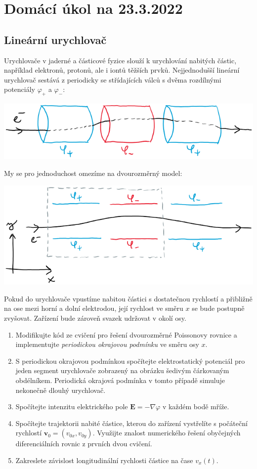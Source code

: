\documentclass[a4paper,11pt,twoside]{article}
\def\vector#1{\boldsymbol{#1}}								%
\begin{document}
\section*{Domácí úkol na 23.3.2022}
\subsection*{Lineární urychlovač}
Urychlovače v jaderné a částicové fyzice slouží k urychlování nabitých částic, například elektronů, protonů, ale i iontů těžších prvků.
Nejjednodušší lineární urychlovač sestává z periodicky se střídajících válců s dvěma rozdílnými potenciály $\varphi_{+}$ a $\varphi_{-}$:
\begin{center}\includegraphics[width=0.7\linewidth]{accelerator.png}\end{center}
My se pro jednoduchost omezíme na dvourozměrný model:
\begin{center}\includegraphics[width=0.7\linewidth]{accelerator2D.png}\end{center}
Pokud do urychlovače vpustíme nabitou částici s dostatečnou rychlostí a přibližně na ose mezi horní a dolní elektrodou, její rychlost ve směru $x$ se bude postupně zvyšovat.
Zařízení bude zároveň svazek udržovat v okolí osy.

\begin{enumerate}
    \item Modifikujte kód ze cvičení pro řešení dvourozměrné Poissonovy rovnice a implementujte \emph{periodickou okrajovou podmínku} ve směru osy $x$.
    
    \item S periodickou okrajovou podmínkou spočítejte elektrostatický potenciál pro jeden segment urychlovače zobrazený na obrázku šedivým čárkovaným obdélníkem.
        Periodická okrajová podmínka v tomto případě simuluje nekonečně dlouhý urychlovač.
    
    \item Spočítejte intenzitu elektrického pole $\vector{E}=-\nabla{\varphi}$ v každém bodě mříže.
    
    \item Spočítejte trajektorii nabité částice, kterou do zařízení vystřelíte s počáteční rychlostí $\vector{v}_{0}=(v_{0x},v_{0y})$.
        Využijte znalost numerického řešení obyčejných diferenciálních rovnic z prvních dvou cvičení.
    
    \item Zakreslete závislost longitudinální rychlosti částice na čase $v_{x}(t)$.
\end{enumerate}
\end{document}
